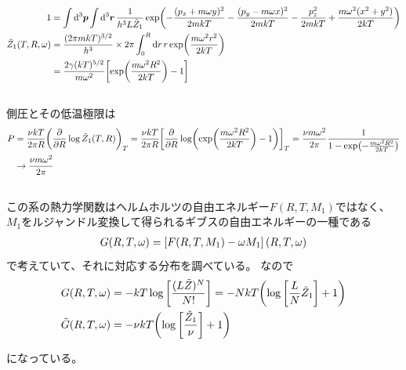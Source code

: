 \documentclass[../ap_2023.tex]{subfiles}
\begin{document}
\subsection{}
\begin{equation}\begin{aligned}[b]
    1 &= \int\dd[3]{\vb*{p}}\int\dd[3]{\vb*{r}} \frac{1}{h^3 L\tilde{Z}_1}\exp(-\frac{(p_x+m\omega y)^2}{2mkT}-\frac{(p_y-m\omega x)^2}{2mkT}-\frac{p_z^2}{2mkT}+\frac{m\omega^2(x^2+y^2)}{2kT})\\
    \tilde{Z}_1(T,R,\omega) &= \frac{(2\pi mkT)^{3/2}}{h^3}\times 2\pi \int_{0}^{R}\dd{r}r\exp(\frac{m\omega^2 r^2}{2kT})\\
    &= \frac{2\gamma (kT)^{5/2}}{m\omega^2}\qty[\exp(\frac{m\omega^2R^2}{2kT})-1]
\end{aligned}\end{equation}

\subsection{}
側圧とその低温極限は
\begin{equation}\begin{aligned}[b]
    P &= \frac{\nu kT}{2\pi R}\qty(\pdv{R}\log\tilde{Z}_1(T,R))_T
        = \frac{\nu kT}{2\pi R}\qty[\pdv{R}\log(\exp(\frac{m\omega^2R^2}{2kT})-1)]_T
        = \frac{\nu m\omega^2}{2\pi}\frac{1}{1-\exp(-\frac{m\omega^2R^2}{2kT})}\\
    &\to \frac{\nu m\omega^2}{2\pi}
\end{aligned}\end{equation}

\subsection{}
この系の熱力学関数はヘルムホルツの自由エネルギー\(F(R,T,M_1)\)ではなく、
\(M_1\)をルジャンドル変換して得られるギブスの自由エネルギーの一種である
\begin{equation}\begin{aligned}[b]
    G(R,T,\omega) = \qty[F(R,T,M_1)-\omega M_1](R,T,\omega)
\end{aligned}\end{equation}
で考えていて、それに対応する分布を調べている。
なので
\begin{equation}\begin{aligned}[b]
    G(R,T,\omega) &= -kT\log\qty[\frac{(L\tilde{Z})^N}{N!}] = -NkT\qty(\log\qty[\frac{L}{N}\tilde{Z}_1]+1)\\
    \tilde{G}(R,T,\omega) &= -\nu kT \qty(\log\qty[\frac{\tilde{Z}_1}{\nu}]+1)\\
\end{aligned}\end{equation}
になっている。
\end{document}
